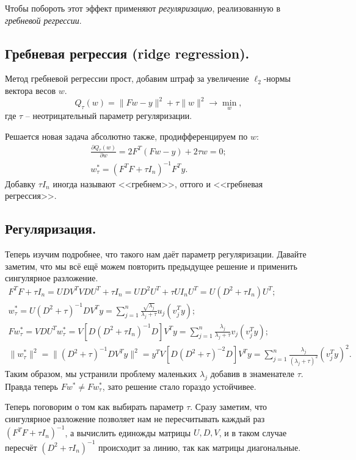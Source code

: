 Чтобы побороть этот эффект применяют \textit{регуляризацию}, реализованную в \textit{гребневой регрессии}.

\subsection*{Гребневая регрессия (ridge regression).}
Метод гребневой регрессии прост, добавим штраф за увеличение $\ell_2$-нормы вектора весов $w$.
$$Q_\tau(w) = \|Fw - y\|^2 + \tau \|w\|^2 \to \min_w,$$
где $\tau$ -- неотрицательный параметр регуляризации.

Решается новая задача абсолютно также, продифференцируем по $w$:
\begin{gather*}
    \frac{\partial Q_\tau(w)}{\partial w} = 2 F^T (Fw - y) + 2\tau w = 0; \\
    w_\tau^* = (F^TF + \tau I_n)^{-1} F^Ty.
\end{gather*}
Добавку $\tau I_n$ иногда называют <<гребнем>>, оттого и <<гребневая регрессия>>.

\subsection*{Регуляризация.}
Теперь изучим подробнее, что такого нам даёт параметр регуляризации.
Давайте заметим, что мы всё ещё можем повторить предыдущее решение и применить сингулярное разложение.
\begin{gather*}
    F^TF + \tau I_n = UDV^TVDU^T + \tau I_n = UD^2U^T + \tau UI_nU^T = U(D^2 + \tau I_n)U^T; \\
    w_\tau^* = U(D^2 + \tau)^{-1}DV^Ty = \sum_{j=1}^n \frac{\sqrt{\lambda_j}}{\lambda_j + \tau}u_j(v_j^Ty); \\
    Fw_\tau^* = VDU^Tw_\tau^* = V\left[D(D^2 + \tau I_n)^{-1}D\right]V^Ty = \sum_{j=1}^n \frac{\lambda_j}{\lambda_j + \tau} v_j(v_j^Ty); \\
    \|w_\tau^*\|^2 = \|(D^2 + \tau)^{-1}DV^Ty\|^2 = y^TV\left[D(D^2 + \tau)^{-2}D\right]V^Ty = \sum_{j=1}^n \frac{\lambda_j}{(\lambda_j + \tau)^2}(v_j^Ty)^2.
\end{gather*}
Таким образом, мы устранили проблему маленьких $\lambda_j$ добавив в знаменателе $\tau$. Правда теперь $Fw^* \not= Fw_\tau^*$, зато решение стало гораздо устойчивее.

Теперь поговорим о том как выбирать параметр $\tau$. Сразу заметим, что сингулярное разложение позволяет нам не пересчитывать каждый раз $(F^TF + \tau I_n)^{-1}$, а вычислить единожды матрицы $U, D, V$, и в таком случае пересчёт $(D^2 + \tau I_n)^{-1}$ происходит за линию, так как матрицы диагональные.

